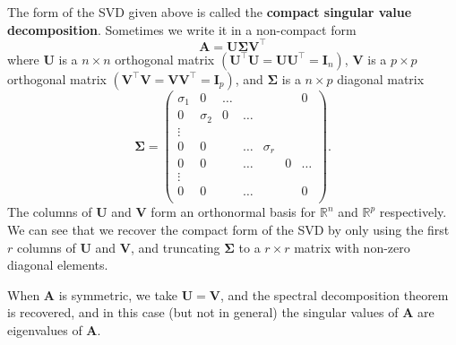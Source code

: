 \documentclass[
]{book}
\theoremstyle{definition}
\theoremstyle{definition}
\theoremstyle{definition}
\theoremstyle{definition}
\theoremstyle{remark}
\begin{document}
The form of the SVD given above is called the \textbf{compact singular value decomposition}. Sometimes we write it in a non-compact form
\[\mathbf A= \mathbf U\boldsymbol{\Sigma}\mathbf V^\top\]
where \(\mathbf U\) is a \(n \times n\) orthogonal matrix \((\mathbf U^\top\mathbf U=\mathbf U\mathbf U^\top = \mathbf I_n)\), \(\mathbf V\) is a \(p \times p\) orthogonal matrix \((\mathbf V^\top\mathbf V=\mathbf V\mathbf V^\top = \mathbf I_p)\), and \(\boldsymbol{\Sigma}\) is a \(n \times p\) diagonal matrix
\begin{equation}
\boldsymbol{\Sigma}= \left(\begin{array}{cccccccc}
\sigma_1&0&\ldots&&&&0\\
0&\sigma_2&0&\ldots&&&\\
\vdots\\
0&0&&\ldots&\sigma_r&&\\
0&0&&\ldots&&0&\ldots\\
\vdots\\
0&0&&\ldots&&&0\\
\end{array}
\right). 
\label{eq:sigmasvd}
\end{equation}
The columns of \(\mathbf U\) and \(\mathbf V\) form an orthonormal basis for \(\mathbb{R}^n\) and \(\mathbb{R}^p\) respectively. We can see that we recover the compact form of the SVD by only using the first \(r\) columns of \(\mathbf U\) and \(\mathbf V\), and truncating \(\boldsymbol{\Sigma}\) to a \(r\times r\) matrix with non-zero diagonal elements.

When \(\mathbf A\) is symmetric, we take \(\mathbf U=\mathbf V\), and the spectral decomposition theorem is recovered, and in this case (but not in general) the singular values of \(\mathbf A\) are eigenvalues of \(\mathbf A\).
\end{document}

